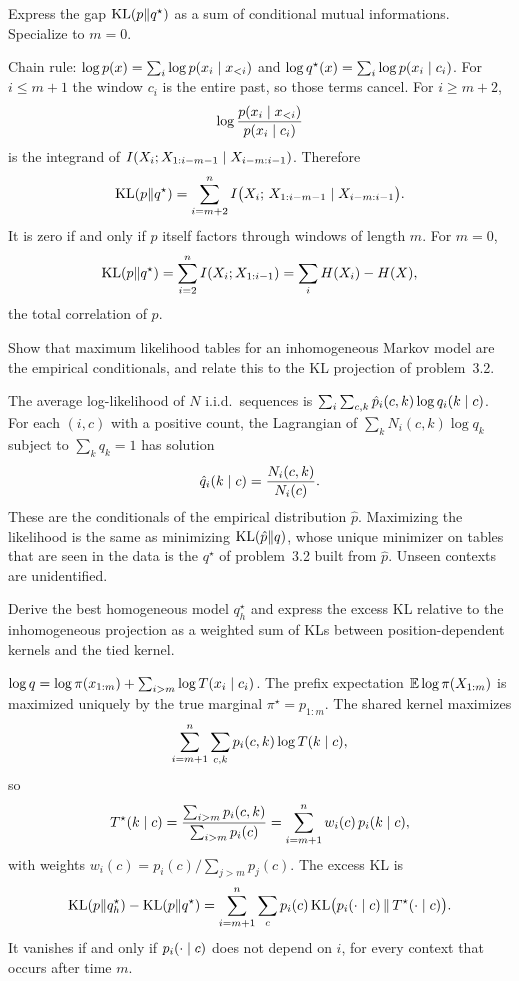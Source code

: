 \begin{hwqbox}
Express the gap $\mathrm{KL}(p\Vert q^\star)$ as a sum of conditional mutual informations. Specialize to $m=0$.
\end{hwqbox}
\begin{hwsolbox}
Chain rule: $\log p(x)=\sum_i\log p(x_i\mid x_{<i})$ and $\log q^\star(x)=\sum_i\log p(x_i\mid c_i)$. For $i\le m+1$ the window $c_i$ is the entire past, so those terms cancel. For $i\ge m+2$,
\[
\log\frac{p(x_i\mid x_{<i})}{p(x_i\mid c_i)}
\]
is the integrand of $I(X_i;X_{1:i-m-1}\mid X_{i-m:i-1})$. Therefore
\[
\mathrm{KL}(p\Vert q^\star)=\sum_{i=m+2}^{n}I\big(X_i;\,X_{1:i-m-1}\mid X_{i-m:i-1}\big).
\]
It is zero if and only if $p$ itself factors through windows of length $m$. For $m=0$,
\[
\mathrm{KL}(p\Vert q^\star)=\sum_{i=2}^n I(X_i;X_{1:i-1})=\sum_i H(X_i)-H(X),
\]
the total correlation of $p$.
\end{hwsolbox}

\begin{hwqbox}
Show that maximum likelihood tables for an inhomogeneous Markov model are the empirical conditionals, and relate this to the KL projection of problem~3.2.
\end{hwqbox}
\begin{hwsolbox}
The average log-likelihood of $N$ i.i.d.\ sequences is $\sum_i\sum_{c,k}\hat p_i(c,k)\log q_i(k\mid c)$. For each $(i,c)$ with a positive count, the Lagrangian of $\sum_k N_i(c,k)\log q_k$ subject to $\sum_k q_k=1$ has solution
\[
\hat q_i(k\mid c)=\frac{N_i(c,k)}{N_i(c)}.
\]
These are the conditionals of the empirical distribution $\hat p$. Maximizing the likelihood is the same as minimizing $\mathrm{KL}(\hat p\Vert q)$, whose unique minimizer on tables that are seen in the data is the $q^\star$ of problem~3.2 built from $\hat p$. Unseen contexts are unidentified.
\end{hwsolbox}

\begin{hwqbox}
Derive the best homogeneous model $q_h^\star$ and express the excess KL relative to the inhomogeneous projection as a weighted sum of KLs between position-dependent kernels and the tied kernel.
\end{hwqbox}
\begin{hwsolbox}
$\log q=\log\pi(x_{1:m})+\sum_{i>m}\log T(x_i\mid c_i)$. The prefix expectation $\mathbb{E}\log\pi(X_{1:m})$ is maximized uniquely by the true marginal $\pi^\star=p_{1:m}$. The shared kernel maximizes
\[
\sum_{i=m+1}^n\sum_{c,k}p_i(c,k)\log T(k\mid c),
\]
so
\[
T^\star(k\mid c)=\frac{\sum_{i>m}p_i(c,k)}{\sum_{i>m}p_i(c)}
=\sum_{i=m+1}^n w_i(c)\,p_i(k\mid c),
\]
with weights $w_i(c)=p_i(c)/\sum_{j>m}p_j(c)$. The excess KL is
\[
\mathrm{KL}(p\Vert q_h^\star)-\mathrm{KL}(p\Vert q^\star)
=\sum_{i=m+1}^n\sum_c p_i(c)\,\mathrm{KL}\big(p_i(\cdot\mid c)\,\Vert\,T^\star(\cdot\mid c)\big).
\]
It vanishes if and only if $p_i(\cdot\mid c)$ does not depend on $i$, for every context that occurs after time $m$.
\end{hwsolbox}

